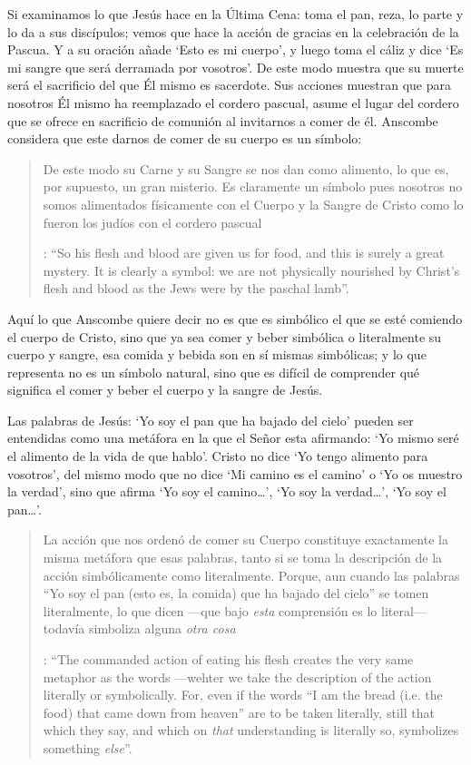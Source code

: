 Si examinamos lo que Jesús hace en la Última Cena: toma el pan, reza, lo parte y lo da a sus discípulos; vemos que hace la acción de gracias en la celebración de la Pascua. Y a su oración añade \enquote*{Esto es mi cuerpo}, y luego toma el cáliz y dice \enquote*{Es mi sangre que será derramada por vosotros}. De este modo muestra que su muerte será el sacrificio del que Él mismo es sacerdote. Sus acciones muestran que para nosotros Él mismo ha reemplazado el cordero pascual, asume el lugar del cordero que se ofrece en sacrificio de comunión al invitarnos a comer de él. Anscombe considera que este darnos de comer de su cuerpo es un símbolo: \blockquote[
{\Cite[110]{anscombe1981erp:ot}}: \enquote{So his flesh and blood are given us for food, and this is surely a great mystery. It is clearly a symbol: we are not physically nourished by Christ's flesh and blood as the Jews were by the paschal lamb}.
]{De este modo su Carne y su Sangre se nos dan como alimento, lo que es, por supuesto, un gran misterio. Es claramente un símbolo pues nosotros no somos alimentados físicamente con el Cuerpo y la Sangre de Cristo como lo fueron los judíos con el cordero pascual}. Aquí lo que Anscombe quiere decir no es que es simbólico el que se esté comiendo el cuerpo de Cristo, sino que ya sea comer y beber simbólica o literalmente su cuerpo y sangre, esa comida y bebida son en sí mismas simbólicas; y lo que representa no es un símbolo natural, sino que es difícil de comprender qué significa el comer y beber el cuerpo y la sangre de Jesús.

Las palabras de Jesús: \enquote*{Yo soy el pan que ha bajado del cielo} pueden ser entendidas como una metáfora en la que el Señor esta afirmando: \enquote*{Yo mismo seré el alimento de la vida de que hablo}. Cristo no dice \enquote*{Yo tengo alimento para vosotros}, del mismo modo que no dice \enquote*{Mi camino es el camino} o \enquote*{Yo os muestro la verdad}, sino que afirma \enquote*{Yo soy el camino\ldots}, \enquote*{Yo soy la verdad\ldots}, \enquote*{Yo soy el pan\ldots}. \blockquote[
{\Cite[110]{anscombe1981erp:ot}}: \enquote{The commanded action of eating his flesh creates the very same metaphor as the words ---wehter we take the description of the action literally or symbolically. For, even if the words ``I am the bread (i.e. the food) that came down from heaven'' are to be taken literally, still that which they say, and which on \emph{that} understanding is literally so, symbolizes something \emph{else}}.
]{La acción que nos ordenó de comer su Cuerpo constituye exactamente la misma metáfora que esas palabras, tanto si se toma la descripción de la acción simbólicamente como literalmente. Porque, aun cuando las palabras ``Yo soy el pan (esto es, la comida) que ha bajado del cielo'' se tomen literalmente, lo que dicen ---que bajo \emph{esta} comprensión es lo literal--- todavía simboliza alguna \emph{otra cosa}}.

